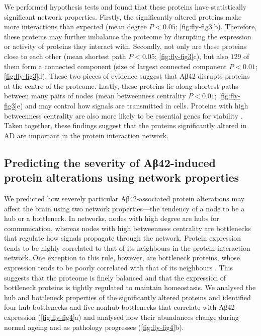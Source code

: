 We performed hypothesis tests and found that these proteins have statistically significant
network properties.
Firstly, the significantly altered proteins make more interactions than expected
(mean degree $P < 0.05$; \ref{fig:fly-fig3}b).
Therefore, these proteins may further imbalance the proteome by disrupting the expression
or activity of proteins they interact with.
Secondly, not only are these proteins close to each other
(mean shortest path $P < 0.05$; \ref{fig:fly-fig3}c),
but also $129$ of them form a connected component
(size of largest connected component $P < 0.01$; \ref{fig:fly-fig3}d).
These two pieces of evidence suggest that Aβ42 disrupts proteins at the centre of the proteome.
Lastly, these proteins lie along shortest paths between many pairs of nodes
(mean betweenness centrality $P < 0.01$; \ref{fig:fly-fig3}e)
and may control how signals are transmitted in cells.
Proteins with high betweenness centrality are also more likely to be essential genes
for viability \cite{Yu2007}.
Taken together, these findings suggest that the proteins significantly altered in AD are
important in the protein interaction network.

\subsection{Predicting the severity of Aβ42-induced protein alterations using network properties}

We predicted how severely particular Aβ42-associated protein alterations may affect
the brain using two network properties—the tendency of a node to be a hub or a bottleneck.
In networks, nodes with high degree are hubs for communication,
whereas nodes with high betweenness centrality are bottlenecks that regulate how signals
propagate through the network.
Protein expression tends to be highly correlated to that of its neighbours in the
protein interaction network.
One exception to this rule, however, are bottleneck proteins,
whose expression tends to be poorly correlated with that of its neighbours \cite{Yu2007}.
This suggests that the proteome is finely balanced and that the expression of
bottleneck proteins is tightly regulated to maintain homeostasis.
We analysed the hub and bottleneck properties of the significantly altered proteins and
identified four hub-bottlenecks and five nonhub-bottlenecks that correlate with
Aβ42 expression (\ref{fig:fly-fig4}a) and analysed how their abundances change during normal ageing and
as pathology progresses (\ref{fig:fly-fig4}b).

